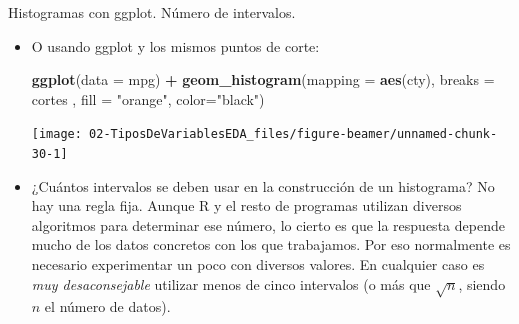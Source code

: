 \documentclass[
  9pt,
  ignorenonframetext,
]{beamer}
\newenvironment{Shaded}{\begin{snugshade}}{\end{snugshade}}
\newcommand{\DataTypeTok}[1]{\textcolor[rgb]{0.13,0.29,0.53}{#1}}
\newcommand{\KeywordTok}[1]{\textcolor[rgb]{0.13,0.29,0.53}{\textbf{#1}}}
\newcommand{\NormalTok}[1]{#1}
\newcommand{\OperatorTok}[1]{\textcolor[rgb]{0.81,0.36,0.00}{\textbf{#1}}}
\newcommand{\StringTok}[1]{\textcolor[rgb]{0.31,0.60,0.02}{#1}}
\begin{document}
\begin{frame}[fragile]{Histogramas con ggplot. Número de intervalos.}
\protect\hypertarget{histogramas-con-ggplot.-numero-de-intervalos.}{}

\begin{itemize}
\item
  O usando ggplot y los mismos puntos de corte:

\begin{Shaded}
\begin{Highlighting}[]
\KeywordTok{ggplot}\NormalTok{(}\DataTypeTok{data =}\NormalTok{ mpg) }\OperatorTok{+}\StringTok{ }
\StringTok{  }\KeywordTok{geom_histogram}\NormalTok{(}\DataTypeTok{mapping =} \KeywordTok{aes}\NormalTok{(cty), }\DataTypeTok{breaks =}\NormalTok{ cortes , }\DataTypeTok{fill =} \StringTok{"orange"}\NormalTok{, }\DataTypeTok{color=}\StringTok{"black"}\NormalTok{)}
\end{Highlighting}
\end{Shaded}

  \begin{center}\texttt{[image: 02-TiposDeVariablesEDA\_files/figure-beamer/unnamed-chunk-30-1]} \end{center}
\item
  ¿Cuántos intervalos se deben usar en la construcción de un histograma?
  No hay una regla fija. Aunque R y el resto de programas utilizan
  diversos algoritmos para determinar ese número, lo cierto es que la
  respuesta depende mucho de los datos concretos con los que trabajamos.
  Por eso normalmente es necesario experimentar un poco con diversos
  valores. En cualquier caso es \emph{muy desaconsejable} utilizar menos
  de cinco intervalos (o más que \(\sqrt{n}\), siendo \(n\) el número de
  datos).
\end{itemize}

\end{frame}
\end{document}
